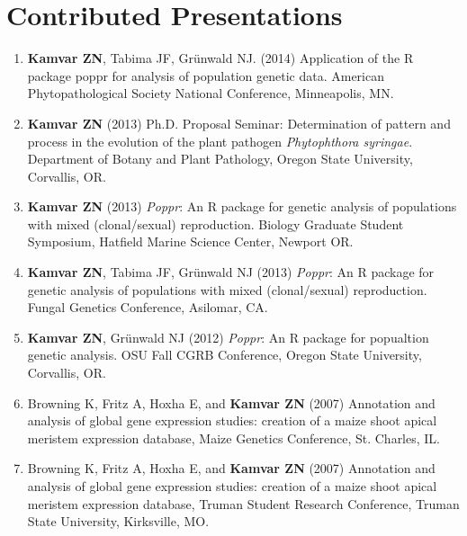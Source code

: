 \section{Contributed Presentations}


\begin{enumerate}[leftmargin = 14pt]

	\item \textbf{Kamvar ZN}, Tabima JF, Gr\"unwald NJ. (2014) Application of
	the R package poppr for analysis of population genetic data. American
	Phytopathological Society National Conference, Minneapolis, MN.

	\vspace{6pt}

	\item \textbf{Kamvar ZN} (2013) Ph.D. Proposal Seminar: Determination of
	pattern and process in the evolution of the plant pathogen
	\textit{Phytophthora syringae}. Department of Botany and Plant Pathology,
	Oregon State University, Corvallis, OR.

	\vspace{6pt}

	\item \textbf{Kamvar ZN} (2013) \textit{Poppr}: An R package for genetic
	analysis of populations with mixed (clonal/sexual) reproduction. Biology
	Graduate Student Symposium, Hatfield Marine Science Center, Newport OR.

	\vspace{6pt}

	\item \textbf{Kamvar ZN}, Tabima JF, Gr\"unwald NJ (2013) \textit{Poppr}: An
	R package for genetic analysis of populations with mixed (clonal/sexual)
	reproduction. Fungal Genetics Conference, Asilomar, CA.

	\vspace{6pt}

	\item \textbf{Kamvar ZN}, Gr\"unwald NJ (2012) \textit{Poppr}: An R package
	for popualtion genetic analysis. OSU Fall CGRB Conference, Oregon State
	University, Corvallis, OR.

	\vspace{6pt}

	\item Browning K, Fritz A, Hoxha E, and \textbf{Kamvar ZN} (2007) Annotation
	and analysis of global gene expression studies: creation of a maize shoot
	apical meristem expression database, Maize Genetics Conference, St. Charles,
	IL.

	\vspace{6pt}

	\item Browning K, Fritz A, Hoxha E, and \textbf{Kamvar ZN} (2007) Annotation
	and analysis of global gene expression studies: creation of a maize shoot
	apical meristem expression database, Truman Student Research Conference,
	Truman State University, Kirksville, MO.

\end{enumerate}

